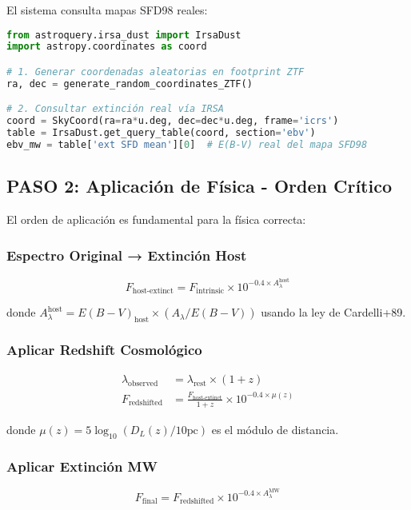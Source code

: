 \documentclass[11pt,a4paper]{article}
\begin{document}
El sistema consulta mapas SFD98 reales:

\begin{lstlisting}[language=Python, caption=Consulta extinción MW real]
from astroquery.irsa_dust import IrsaDust
import astropy.coordinates as coord

# 1. Generar coordenadas aleatorias en footprint ZTF
ra, dec = generate_random_coordinates_ZTF()

# 2. Consultar extinción real vía IRSA
coord = SkyCoord(ra=ra*u.deg, dec=dec*u.deg, frame='icrs')
table = IrsaDust.get_query_table(coord, section='ebv')
ebv_mw = table['ext SFD mean'][0]  # E(B-V) real del mapa SFD98
\end{lstlisting}

\subsection{PASO 2: Aplicación de Física - Orden Crítico}

El orden de aplicación es fundamental para la física correcta:

\subsubsection{Espectro Original → Extinción Host}
\begin{equation}
F_{\text{host-extinct}} = F_{\text{intrinsic}} \times 10^{-0.4 \times A_\lambda^{\text{host}}}
\end{equation}

donde $A_\lambda^{\text{host}} = E(B-V)_{\text{host}} \times (A_\lambda/E(B-V))$ usando la ley de Cardelli+89.

\subsubsection{Aplicar Redshift Cosmológico}
\begin{align}
\lambda_{\text{observed}} &= \lambda_{\text{rest}} \times (1 + z) \\
F_{\text{redshifted}} &= \frac{F_{\text{host-extinct}}}{1 + z} \times 10^{-0.4 \times \mu(z)}
\end{align}

donde $\mu(z) = 5 \log_{10}(D_L(z)/10\text{pc})$ es el módulo de distancia.

\subsubsection{Aplicar Extinción MW}
\begin{equation}
F_{\text{final}} = F_{\text{redshifted}} \times 10^{-0.4 \times A_\lambda^{\text{MW}}}
\end{equation}
\end{document}
